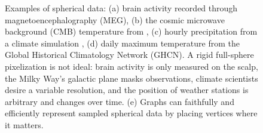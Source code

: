 \documentclass{article} %
\newcommand{\todo}[1]{{\color[rgb]{.6,.1,.6}{#1}}}
\begin{document}
\begin{figure}[h]
	\centering
	 \hspace{0.1em}
	 \hfill
	 \hfill
	 \hfill
	\caption{
		Examples of spherical data:
		(a) brain activity recorded through magnetoencephalography (MEG),\protect\footnotemark
		(b) the cosmic microwave background (CMB) temperature from \citet{planck2015overview},
		(c) hourly precipitation from a climate simulation \citep{jiang2019sphericalcnn}, %
		(d) daily maximum temperature from the Global Historical Climatology Network (GHCN).\protect\footnotemark
		A rigid full-sphere pixelization is not ideal: brain activity is only measured on the scalp, the Milky Way's galactic plane masks observations, climate scientists desire a variable resolution, and the position of weather stations is arbitrary and changes over time.
		(e) Graphs can faithfully and efficiently represent sampled spherical data by placing vertices where it matters.
	}
	\label{fig:examples}
\end{figure}
\end{document}
